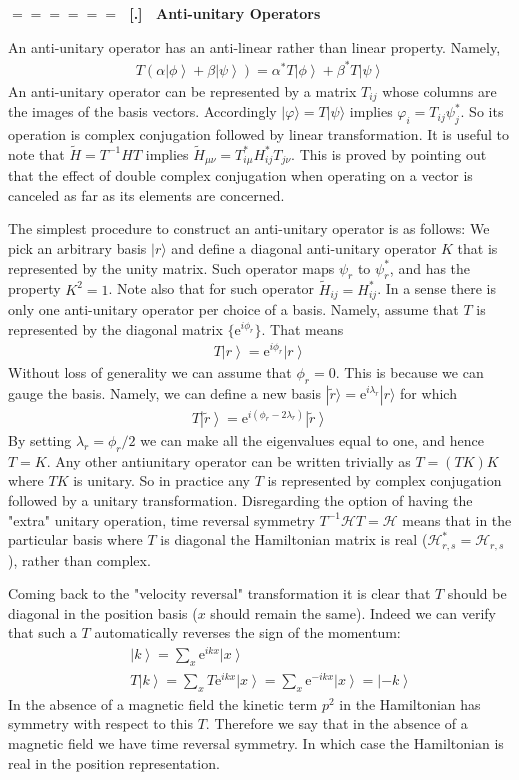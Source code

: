 \documentclass[onecolumn,fleqn]{revtex4}
\newcommand{\eexp}{\mathrm{e}^}
\newcommand{\beq}{\begin{eqnarray}}
\newcommand{\eeq}{\end{eqnarray}}
\renewcommand{\thesubsection}{\arabic{subsection}}
\renewcommand{\thesubsubsection}{\arabic{subsubsection}}
\newcommand{\sheadC}[1]
{
\addtocounter{subsubsection}{1}
\vspace{5mm}
{\Large\bf $=\!=\!=\!=\!=\!=\;$ [\thesubsection.\thesubsubsection] \ #1}  
\nopagebreak
\phantomsection
}
\begin{document}
\sheadC{Anti-unitary Operators} 
 
An anti-unitary operator has an anti-linear 
rather than linear property. Namely,  
\beq
T\left( \alpha \left\vert \phi \right\rangle 
+\beta \left\vert \psi \right\rangle \right) 
= \alpha^* T\left\vert \phi \right\rangle 
+ \beta^* T\left\vert \psi \right\rangle  
\eeq
An anti-unitary operator can be represented 
by a matrix $T_{ij}$ whose columns are the images 
of the basis vectors. 
Accordingly ${|\varphi\rangle = T |\psi\rangle}$ 
implies ${ \varphi_i = T_{ij}\psi_j^* }$.
So its operation is complex conjugation followed 
by linear transformation. 
It is useful to note that ${ \tilde{H} = T^{-1}HT }$ 
implies ${ \tilde{H}_{\mu\nu} = T^{*}_{i\mu} H_{ij}^{*} T_{j\nu} }$.
This is proved by pointing out that the effect 
of double complex conjugation when operating on 
a vector is canceled as far as its elements are concerned.

 
The simplest procedure to construct 
an anti-unitary operator is as follows: 
We pick an arbitrary basis ${|r\rangle}$ 
and define a diagonal anti-unitary operator $K$ 
that is represented by the unity matrix. 
Such operator maps $\psi_r$ to $\psi_r^{*}$,  
and has the property $K^2=1$.
Note also that for such operator ${ \tilde{H}_{ij} = H_{ij}^{*}}$.    
In a sense there is only one anti-unitary 
operator per choice of a basis. Namely, assume 
that $T$ is represented by the diagonal 
matrix ${\{ \eexp{i \phi_{r}} \}}$. That means  
\beq
T\left\vert r\right\rangle = \eexp{i \phi_{r}} \left\vert r\right\rangle 
\eeq
Without loss of generality we can assume 
that $\phi_{r}=0$. This is because we can 
gauge the basis. Namely, we can define 
a new basis $|\tilde{r}\rangle = \eexp{i\lambda_r} |r\rangle$ 
for which  
\beq
T\left\vert \tilde{r} \right\rangle 
= \eexp{ i (\phi_{r} - 2\lambda_r) } \left\vert \tilde{r} \right\rangle 
\eeq
By setting $\lambda_r = \phi_r/2$ we can make 
all the eigenvalues equal to one, and hence $T=K$.
Any other antiunitary operator can be 
written trivially as $T=(TK)K$ where $TK$ is unitary.
So in practice any $T$ is represented 
by complex conjugation followed by a unitary 
transformation.  Disregarding the option of having 
the "extra" unitary operation, time reversal 
symmetry $T^{-1} \mathcal{H} T = \mathcal{H}$
means that in the particular basis 
where $T$ is diagonal the Hamiltonian matrix 
is real ($\mathcal{H}_{r,s}^* = \mathcal{H}_{r,s}$), 
rather than complex. 


Coming back to the "velocity reversal" transformation 
it is clear that $T$ should be diagonal in the position 
basis ($x$ should remain the same). Indeed we can verify 
that such a $T$ automatically reverses the sign of the momentum:
\beq 
&& \left\vert k\right\rangle = \sum_{x}\eexp{ikx}\left\vert x\right\rangle 
\\ \nonumber  
&& T\left\vert k\right\rangle = \sum_{x}T\eexp{ikx}\left\vert x\right\rangle 
=\sum_{x}\eexp{-ikx}\left\vert x\right\rangle =\left\vert -k\right\rangle 
\eeq
In the absence of a magnetic field the kinetic term $p^2$ 
in the Hamiltonian has symmetry with respect to this $T$. 
Therefore we say that in the absence of a magnetic field 
we have time reversal symmetry. In which case the Hamiltonian 
is real in the position representation. 
\end{document}
